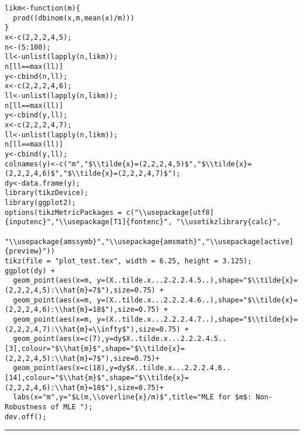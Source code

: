 \documentclass[]{book}
\theoremstyle{definition}
\theoremstyle{definition}
\theoremstyle{definition}
\theoremstyle{remark}
\begin{document}
\hypertarget{toggleCodeFreq.3}{}
\begin{verbatim}
likm<-function(m){
  prod((dbinom(x,m,mean(x)/m)))
}
x<-c(2,2,2,4,5);
n<-(5:100);
ll<-unlist(lapply(n,likm));
n[ll==max(ll)]
y<-cbind(n,ll);
x<-c(2,2,2,4,6);
ll<-unlist(lapply(n,likm));
n[ll==max(ll)]
y<-cbind(y,ll);
x<-c(2,2,2,4,7);
ll<-unlist(lapply(n,likm));
n[ll==max(ll)]
y<-cbind(y,ll);
colnames(y)<-c("m","$\\tilde{x}=(2,2,2,4,5)$","$\\tilde{x}=(2,2,2,4,6)$","$\\tilde{x}=(2,2,2,4,7)$");
dy<-data.frame(y);
library(tikzDevice);
library(ggplot2);
options(tikzMetricPackages = c("\\usepackage[utf8]{inputenc}","\\usepackage[T1]{fontenc}", "\\usetikzlibrary{calc}", 
                               "\\usepackage{amssymb}","\\usepackage{amsmath}","\\usepackage[active]{preview}"))
tikz(file = "plot_test.tex", width = 6.25, height = 3.125);
ggplot(dy) + 
  geom_point(aes(x=m, y=(X..tilde.x...2.2.2.4.5..),shape="$\\tilde{x}=(2,2,2,4,5):\\hat{m}=7$"),size=0.75) + 
  geom_point(aes(x=m, y=(X..tilde.x...2.2.2.4.6..),shape="$\\tilde{x}=(2,2,2,4,6):\\hat{m}=18$"),size=0.75) +
  geom_point(aes(x=m, y=(X..tilde.x...2.2.2.4.7..),shape="$\\tilde{x}=(2,2,2,4,7):\\hat{m}=\\infty$"),size=0.75) +
  geom_point(aes(x=c(7),y=dy$X..tilde.x...2.2.2.4.5..[3],colour="$\\hat{m}$",shape="$\\tilde{x}=(2,2,2,4,5):\\hat{m}=7$"),size=0.75)+
  geom_point(aes(x=c(18),y=dy$X..tilde.x...2.2.2.4.6..[14],colour="$\\hat{m}$",shape="$\\tilde{x}=(2,2,2,4,6):\\hat{m}=18$"),size=0.75)+
  labs(x="m",y="$L(m,\\overline{x}/m)$",title="MLE for $m$: Non-Robustness of MLE "); 
dev.off();
\end{verbatim}

\begin{center}\rule{0.5\linewidth}{\linethickness}\end{center}
\end{document}
